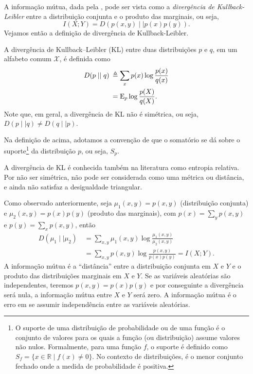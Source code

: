 A informação mútua, dada pela , pode ser vista como
a \emph{divergência de Kullback-Leibler} entre a distribuição conjunta e o produto
das marginais, ou seja,
\begin{equation}
I(X;Y) = D(p(x,y) \mid\mid p(x)p(y)) .
\end{equation}
Vejamos então a definição de divergência de Kullback-Leibler.
\begin{definition}\label{def:divKL}
A divergência de Kullback–Leibler (KL) entre duas distribuições $p$ e $q$, em um
alfabeto comum $\mathcal{X}$, é definida como
\begin{subequations}\label{eq:divergenciaKL}
\begin{align}
D(p \mid\mid q) \: &\triangleq \sum_x p(x) \log \frac{p(x)}{q(x)} \\
        &= \mathrm{E}_p \log \frac{p(X)}{q(X)} .
\end{align}
\end{subequations}
Note que, em geral, a divergência de KL não é simétrica, ou seja, $D(p \mid\mid q) \neq D(q \mid\mid p)$.
\end{definition}
Na definição de acima, adotamos a convenção de que o somatório se dá
sobre o suporte\footnote{O suporte de uma distribuição de probabilidade ou de uma função é
  o conjunto de valores para os quais a função (ou distribuição) assume valores não nulos.
  Formalmente, para uma função $f$, o suporte é definido como $S_f = \{ x \in \mathbb{R} \mid f(x) \neq 0 \}$.
  No contexto de distribuições, é o menor conjunto fechado onde a medida de probabilidade é positiva.}
  da distribuição $p$, ou seja, $S_p$. %

A divergência de KL é conhecida também na literatura como entropia relativa.
Por não ser simétrica, não pode ser considerada como uma métrica ou distância,
e ainda não satisfaz a desigualdade triangular.

Como observado anteriormente, seja $\mu_1(x,y) = p(x,y)$ (distribuição conjunta) e $\mu_2(x,y)=p(x)p(y)$ (produto das marginais),
com $p(x)=\sum_y p(x,y)$ e $p(y)=\sum_x p(x,y)$, então
\begin{subequations}\label{eq:divergenciaKLinfmut}
\begin{align}
 D(\mu_1 \mid\mid \mu_2) \: &= \sum_{x,y} \mu_1(x,y) \log \frac{\mu_1(x,y)}{\mu_2(x,y)} \\
              &= \sum_{x,y} p(x,y) \log \frac{p(x,y)}{p(x)p(y)} = I(X;Y) .
\end{align}
\end{subequations}
A informação mútua
é a ``distância'' entre a distribuição conjunta em $X$ e $Y$ e o
produto das distribuições marginais em $X$ e $Y$. Se as variáveis aleatórias
são independentes, teremos $p(x,y)=p(x)p(y)$ e por conseguinte a divergência
será nula, a informação mútua entre $X$ e $Y$ será zero. A informação mútua é
o erro em se assumir independência entre as variáveis aleatórias.

